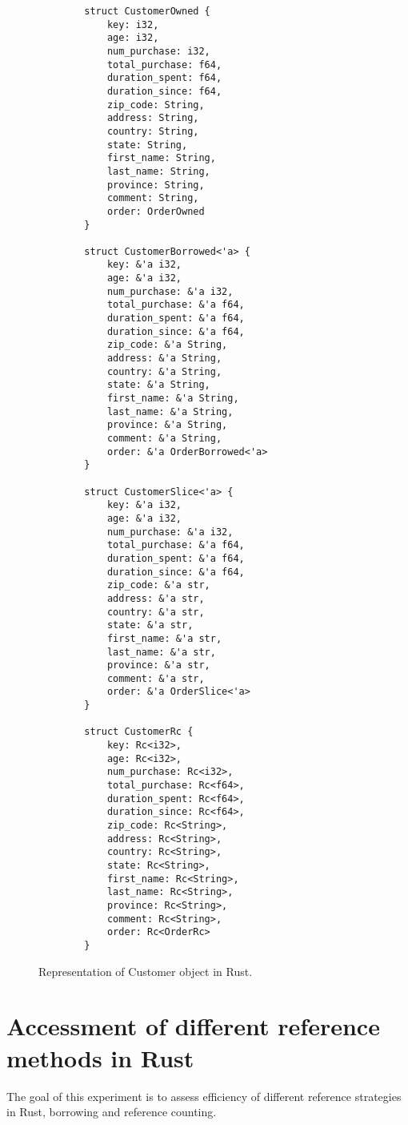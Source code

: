 \begin{figure}[htb]
    \begin{lstlisting}
        struct CustomerOwned {
            key: i32,
            age: i32,
            num_purchase: i32,
            total_purchase: f64,
            duration_spent: f64, 
            duration_since: f64,
            zip_code: String,
            address: String,
            country: String,
            state: String,
            first_name: String,
            last_name: String,
            province: String,
            comment: String, 
            order: OrderOwned
        }

        struct CustomerBorrowed<'a> {
            key: &'a i32,
            age: &'a i32,
            num_purchase: &'a i32,
            total_purchase: &'a f64,
            duration_spent: &'a f64, 
            duration_since: &'a f64,
            zip_code: &'a String,
            address: &'a String,
            country: &'a String,
            state: &'a String,
            first_name: &'a String,
            last_name: &'a String,
            province: &'a String,
            comment: &'a String, 
            order: &'a OrderBorrowed<'a>
        }

        struct CustomerSlice<'a> {
            key: &'a i32,
            age: &'a i32,
            num_purchase: &'a i32,
            total_purchase: &'a f64,
            duration_spent: &'a f64, 
            duration_since: &'a f64,
            zip_code: &'a str,
            address: &'a str,
            country: &'a str, 
            state: &'a str,
            first_name: &'a str,
            last_name: &'a str,
            province: &'a str,
            comment: &'a str,
            order: &'a OrderSlice<'a>
        }

        struct CustomerRc {
            key: Rc<i32>,
            age: Rc<i32>,
            num_purchase: Rc<i32>,
            total_purchase: Rc<f64>,
            duration_spent: Rc<f64>, 
            duration_since: Rc<f64>,
            zip_code: Rc<String>,
            address: Rc<String>,
            country: Rc<String>,
            state: Rc<String>,
            first_name: Rc<String>,
            last_name: Rc<String>,
            province: Rc<String>,
            comment: Rc<String>, 
            order: Rc<OrderRc>
        }
    \end{lstlisting}
    \caption{Representation of Customer object in Rust.}
    \label{fig:Sampling}
\end{figure}


\section{Accessment of different reference methods in Rust}
\label{sec:history}
The goal of this experiment is to assess efficiency of different reference strategies in Rust, borrowing and reference counting. 

